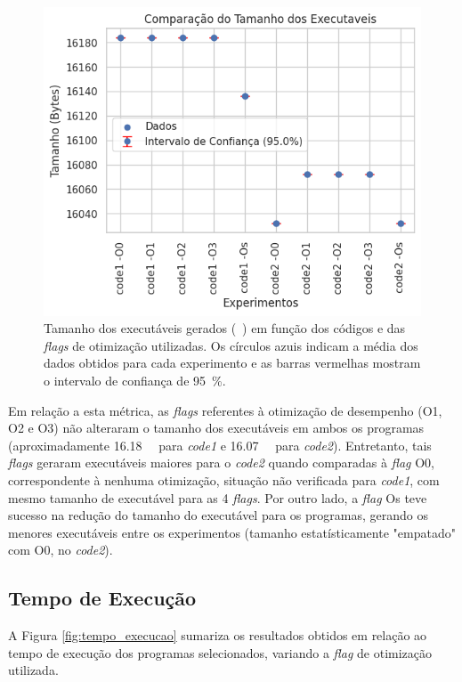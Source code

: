 \documentclass[12pt,a4paper]{article}
\begin{document}
\begin{figure}[H]
\centering
\includegraphics[width=0.80\linewidth]{Figures/comparacao_tamanho_codigo_intervalo.png}
\caption{Tamanho dos executáveis gerados (\si{\kilo\byte}) em função dos códigos e das \textit{flags} de otimização utilizadas. Os círculos azuis indicam a média dos dados obtidos para cada experimento e as barras vermelhas mostram o intervalo de confiança de \SI{95}{\percent}.}
\label{fig:tamanho_executavel}
\end{figure}

Em relação a esta métrica, as \textit{flags} referentes à otimização de desempenho (O1, O2 e O3) não alteraram o tamanho dos executáveis em ambos os programas (aproximadamente \SI{16,18}{\kilo\byte} para \textit{code1} e \SI{16,07}{\kilo\byte} para \textit{code2}). Entretanto, tais \textit{flags} geraram executáveis maiores para o \textit{code2} quando comparadas à \textit{flag} O0, correspondente à nenhuma otimização, situação não verificada para \textit{code1}, com mesmo tamanho de executável para as 4 \textit{flags}. Por outro lado, a \textit{flag} Os teve sucesso na redução do tamanho do executável para os programas, gerando os menores executáveis entre os experimentos (tamanho estatísticamente "empatado" com O0, no \textit{code2}). 

\subsection{Tempo de Execução} \label{sec:tempo_execucao}

A Figura \ref{fig:tempo_execucao} sumariza os resultados obtidos em relação ao tempo de execução dos programas selecionados, variando a \textit{flag} de otimização utilizada.
\end{document}
